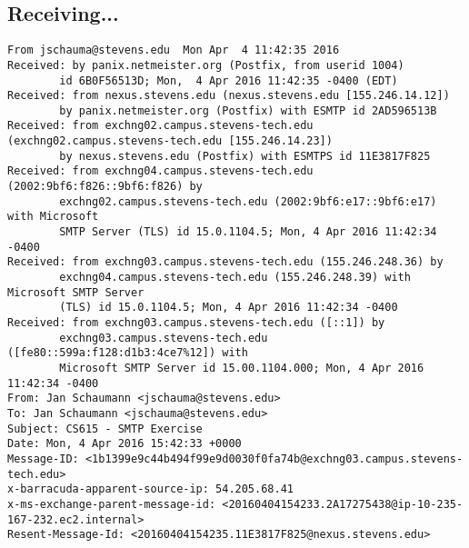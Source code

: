 \documentclass[xga]{xdvislides}
\begin{document}
\subsection{Receiving...}
\smallish
\begin{verbatim}
From jschauma@stevens.edu  Mon Apr  4 11:42:35 2016
Received: by panix.netmeister.org (Postfix, from userid 1004)
        id 6B0F56513D; Mon,  4 Apr 2016 11:42:35 -0400 (EDT)
Received: from nexus.stevens.edu (nexus.stevens.edu [155.246.14.12])
        by panix.netmeister.org (Postfix) with ESMTP id 2AD596513B
Received: from exchng02.campus.stevens-tech.edu (exchng02.campus.stevens-tech.edu [155.246.14.23])
        by nexus.stevens.edu (Postfix) with ESMTPS id 11E3817F825
Received: from exchng04.campus.stevens-tech.edu (2002:9bf6:f826::9bf6:f826) by
        exchng02.campus.stevens-tech.edu (2002:9bf6:e17::9bf6:e17) with Microsoft
        SMTP Server (TLS) id 15.0.1104.5; Mon, 4 Apr 2016 11:42:34 -0400
Received: from exchng03.campus.stevens-tech.edu (155.246.248.36) by
        exchng04.campus.stevens-tech.edu (155.246.248.39) with Microsoft SMTP Server
        (TLS) id 15.0.1104.5; Mon, 4 Apr 2016 11:42:34 -0400
Received: from exchng03.campus.stevens-tech.edu ([::1]) by
        exchng03.campus.stevens-tech.edu ([fe80::599a:f128:d1b3:4ce7%12]) with
        Microsoft SMTP Server id 15.00.1104.000; Mon, 4 Apr 2016 11:42:34 -0400
From: Jan Schaumann <jschauma@stevens.edu>
To: Jan Schaumann <jschauma@stevens.edu>
Subject: CS615 - SMTP Exercise
Date: Mon, 4 Apr 2016 15:42:33 +0000
Message-ID: <1b1399e9c44b494f99e9d0030f0fa74b@exchng03.campus.stevens-tech.edu>
x-barracuda-apparent-source-ip: 54.205.68.41
x-ms-exchange-parent-message-id: <20160404154233.2A17275438@ip-10-235-167-232.ec2.internal>
Resent-Message-Id: <20160404154235.11E3817F825@nexus.stevens.edu>
\end{verbatim}
\end{document}
